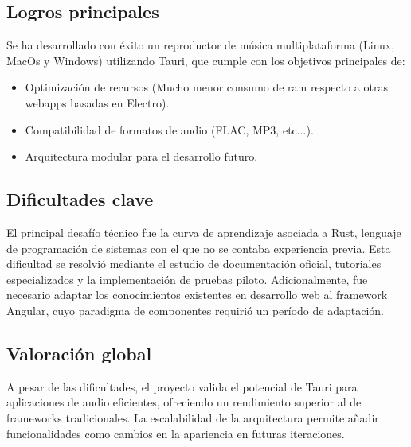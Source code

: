 \documentclass[11pt, a4paper]{article}
\begin{document}
        \subsection{Logros principales}

        Se ha desarrollado con éxito un reproductor de música multiplataforma (Linux, MacOs y Windows) utilizando Tauri, que cumple con los objetivos principales de:

        \begin{itemize}
            \item Optimización de recursos (Mucho menor consumo de ram respecto a otras webapps basadas en Electro).
            \item Compatibilidad de formatos de audio (FLAC, MP3, etc...).
            \item Arquitectura modular para el desarrollo futuro.
        \end{itemize}

        \subsection{Dificultades clave}

        El principal desafío técnico fue la curva de aprendizaje asociada a Rust, lenguaje de programación de sistemas con el que no se contaba experiencia previa. Esta dificultad se resolvió mediante el estudio de documentación oficial, tutoriales especializados y la implementación de pruebas piloto. Adicionalmente, fue necesario adaptar los conocimientos existentes en desarrollo web al framework Angular, cuyo paradigma de componentes requirió un período de adaptación.

        \subsection{Valoración global}

        A pesar de las dificultades, el proyecto valida el potencial de Tauri para aplicaciones de audio eficientes, ofreciendo un rendimiento superior al de frameworks tradicionales. La escalabilidad de la arquitectura permite añadir funcionalidades como cambios en la apariencia en futuras iteraciones.
\end{document}
